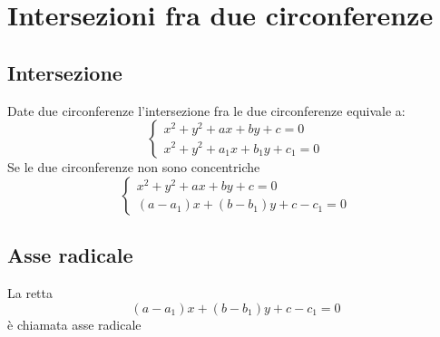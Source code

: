 \chapter{Intersezioni fra due circonferenze}
{\centering
	
	\par}
\section{Intersezione} Date due circonferenze l'intersezione fra le due circonferenze equivale a: 
\begin{equation*}
\begin{cases}
x^2+y^2+ax+by+c=0\\
x^2+y^2+a_1x+b_1y+c_1=0
\end{cases}
\end{equation*}
Se le due circonferenze non sono concentriche 
\begin{equation*}
\begin{cases}
x^2+y^2+ax+by+c=0\\
(a-a_1)x+(b-b_1)y+c-c_1=0
\end{cases}
\end{equation*}
\section{Asse radicale}
La retta \begin{equation*}
(a-a_1)x+(b-b_1)y+c-c_1=0
\end{equation*} è chiamata asse radicale